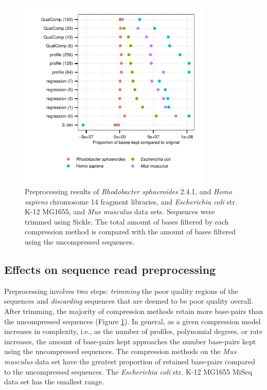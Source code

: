 \documentclass{bioinfo}
\begin{document}
\begin{figure}[!tbp]%
\centerline{\includegraphics[width=3.65in]{preprocessing_results.pdf}}
\caption{Preprocessing results of \textit{Rhodobacter sphaeroides}
  2.4.1, and \textit{Homo sapiens} chromosome 14 fragment libraries,
  and \textit{Escherichia coli} str. K-12 MG1655, and \textit{Mus
    musculus} data sets. Sequences were trimmed using Sickle. The
  total amount of bases filtered by each compression method is
  compared with the amount of bases filtered using the uncompressed
  sequences.}
  \label{fig:preprocessing}
\end{figure}

\subsection{Effects on sequence read preprocessing}

Preprocessing involves two steps: \emph{trimming} the poor quality
regions of the sequences and \emph{discarding} sequences that are
deemed to be poor quality overall. After trimming, the majority of
compression methods retain more base-pairs than the uncompressed
sequences (Figure \ref{fig:preprocessing}). In general, as a given
compression model increases in complexity, i.e., as the number of
profiles, polynomial degrees, or rate increases, the amount of
base-pairs kept approaches the number base-pairs kept using the
uncompressed sequences. The compression methods on the \textit{Mus
  musculus} data set have the greatest proportion of retained
base-pairs compared to the uncompressed sequences. The
\textit{Escherichia coli} str. K-12 MG1655 MiSeq data set has the
smallest range.
\end{document}
